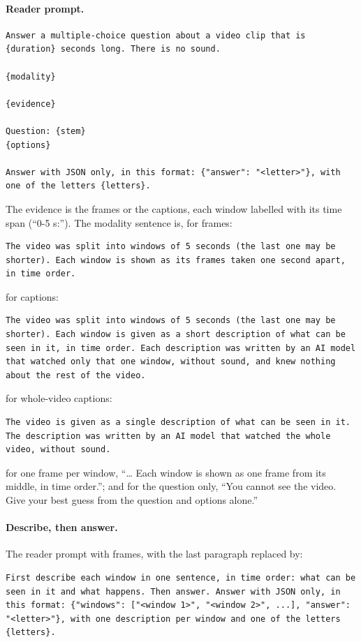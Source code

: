 \documentclass[11pt]{article}
\begin{document}
\paragraph{Reader prompt.}
\begin{lstlisting}
Answer a multiple-choice question about a video clip that is {duration} seconds long. There is no sound.

{modality}

{evidence}

Question: {stem}
{options}

Answer with JSON only, in this format: {"answer": "<letter>"}, with one of the letters {letters}.
\end{lstlisting}
The evidence is the frames or the captions, each window labelled with its time span (``0-5 s:''). The modality sentence is, for frames:
\begin{lstlisting}
The video was split into windows of 5 seconds (the last one may be shorter). Each window is shown as its frames taken one second apart, in time order.
\end{lstlisting}
for captions:
\begin{lstlisting}
The video was split into windows of 5 seconds (the last one may be shorter). Each window is given as a short description of what can be seen in it, in time order. Each description was written by an AI model that watched only that one window, without sound, and knew nothing about the rest of the video.
\end{lstlisting}
for whole-video captions:
\begin{lstlisting}
The video is given as a single description of what can be seen in it. The description was written by an AI model that watched the whole video, without sound.
\end{lstlisting}
for one frame per window, ``\ldots{} Each window is shown as one frame from its middle, in time order.''; and for the question only, ``You cannot see the video. Give your best guess from the question and options alone.''

\paragraph{Describe, then answer.} The reader prompt with frames, with the last paragraph replaced by:
\begin{lstlisting}
First describe each window in one sentence, in time order: what can be seen in it and what happens. Then answer. Answer with JSON only, in this format: {"windows": ["<window 1>", "<window 2>", ...], "answer": "<letter>"}, with one description per window and one of the letters {letters}.
\end{lstlisting}
\end{document}
